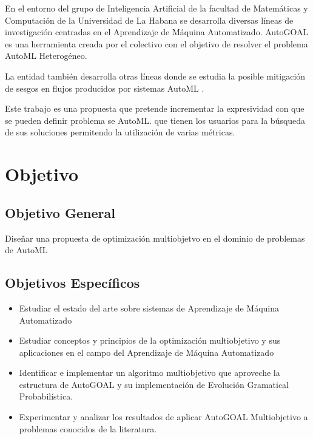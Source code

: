 En el entorno del grupo de Inteligencia Artificial de la facultad de Matem\'aticas y Computaci\'on de la Universidad de La Habana se desarrolla diversas l\'ineas de investigaci\'on centradas en el Aprendizaje de M\'aquina Automatizado. AutoGOAL  es una herramienta creada por el colectivo con el objetivo de resolver el problema AutoML Heterog\'eneo.

La entidad tambi\'en desarrolla otras l\'ineas donde se estudia la posible mitigaci\'on de sesgos en flujos producidos por sistemas AutoML . 

Este trabajo es una propuesta que pretende incrementar la expresividad con que se pueden definir problema se AutoML. que tienen los usuarios para la b\'usqueda de sus soluciones permitendo la utilizaci\'on de varias m\'etricas.


 
\section*{Objetivo}
\subsection*{Objetivo General}
Dise\~nar una propuesta de optimizaci\'on multiobjetvo en el dominio de problemas de AutoML
\subsection*{Objetivos Espec\'ificos}
\begin{itemize}
    \item Estudiar el estado del arte sobre sistemas de Aprendizaje de M\'aquina Automatizado
    \item Estudiar conceptos y principios de la optimizaci\'on multiobjetivo y sus aplicaciones en el campo del Aprendizaje de M\'aquina Automatizado
    \item Identificar e implementar un algoritmo multiobjetivo que aproveche la estructura de AutoGOAL y su implementaci\'on de Evoluci\'on Gramatical Probabil\'istica.
    \item Experimentar y analizar los resultados de aplicar AutoGOAL Multiobjetivo a problemas conocidos de la literatura.
\end{itemize}

